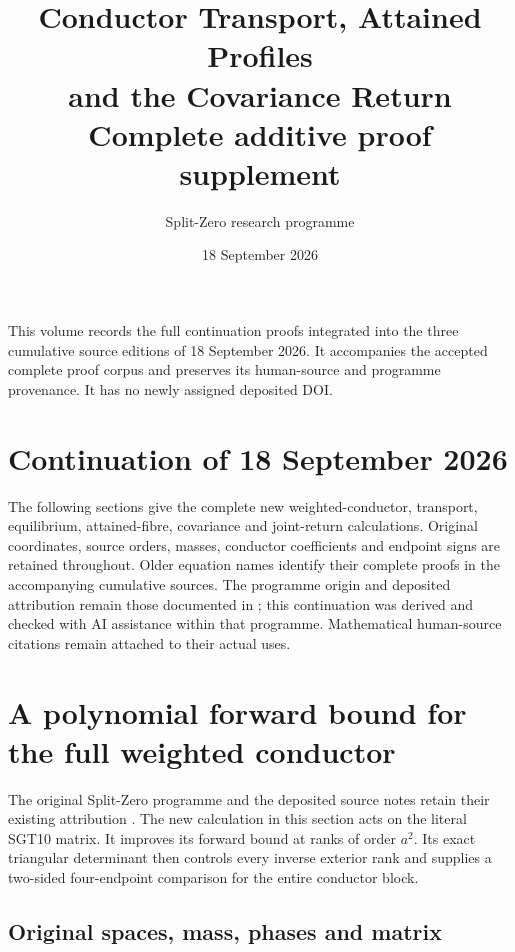 \documentclass[11pt,a4paper]{article}
\title{Conductor Transport, Attained Profiles\\and the Covariance Return\\[0.6em]\large Complete additive proof supplement}
\author{Split-Zero research programme}
\date{18 September 2026}
\begin{document}
\maketitle
\noindent
This volume records the full continuation proofs integrated into the
three cumulative source editions of 18 September 2026. It accompanies
the accepted complete proof corpus and preserves its human-source and
programme provenance. It has no newly assigned deposited DOI.
\tableofcontents

\clearpage
\section*{Continuation of 18 September 2026}
The following sections give the complete new weighted-conductor,
transport, equilibrium, attained-fibre, covariance and joint-return
calculations. Original coordinates, source orders, masses, conductor
coefficients and endpoint signs are retained throughout. Older equation
names identify their complete proofs in the accompanying cumulative
sources. The programme origin and deposited attribution remain those
documented in \cite{human:globalization2026,human:splitzero2026}; this
continuation was derived and checked with AI assistance within that
programme. Mathematical human-source citations remain attached to their
actual uses.

\begingroup
\providecommand{\rank}{\operatorname{rank}}
\section{A polynomial forward bound for the full weighted conductor}
\label{sec:WCF}

The original Split-Zero programme and the deposited source notes retain
their existing attribution \cite{human:globalization2026,human:splitzero2026}.
The new calculation in this section acts on the literal SGT10 matrix. It
improves its forward bound at ranks of order $a^2$. Its exact triangular
determinant then controls every inverse exterior rank and supplies a
two-sided four-endpoint comparison for the entire conductor block.

\subsection{Original spaces, mass, phases and matrix}
\end{document}

